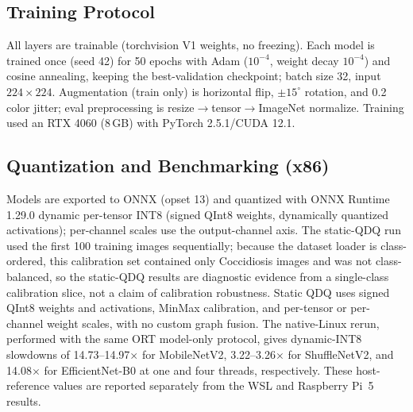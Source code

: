 \documentclass[conference,a4paper]{IEEEtran}
\begin{document}
\subsection{Training Protocol}
All layers are trainable (torchvision V1 weights, no freezing). Each model is trained once (seed 42) for 50 epochs with Adam ($10^{-4}$, weight decay $10^{-4}$) and cosine annealing, keeping the best-validation checkpoint; batch size 32, input $224\times224$. Augmentation (train only) is horizontal flip, $\pm 15^\circ$ rotation, and 0.2 color jitter; eval preprocessing is resize$\to$tensor$\to$ImageNet normalize. Training used an RTX 4060 (8\,GB) with PyTorch 2.5.1/CUDA 12.1.

\subsection{Quantization and Benchmarking (x86)}
Models are exported to ONNX (opset 13) and quantized with ONNX Runtime 1.29.0 dynamic per-tensor INT8 (signed QInt8 weights, dynamically quantized activations); per-channel scales use the output-channel axis. The static-QDQ run used the first 100 training images sequentially; because the dataset loader is class-ordered, this calibration set contained only Coccidiosis images and was not class-balanced, so the static-QDQ results are diagnostic evidence from a single-class calibration slice, not a claim of calibration robustness. Static QDQ uses signed QInt8 weights and activations, MinMax calibration, and per-tensor or per-channel weight scales, with no custom graph fusion. The native-Linux rerun, performed with the same ORT model-only protocol, gives dynamic-INT8 slowdowns of 14.73--14.97$\times$ for MobileNetV2, 3.22--3.26$\times$ for ShuffleNetV2, and 14.08$\times$ for EfficientNet-B0 at one and four threads, respectively. These host-reference values are reported separately from the WSL and Raspberry Pi~5 results.
\end{document}
